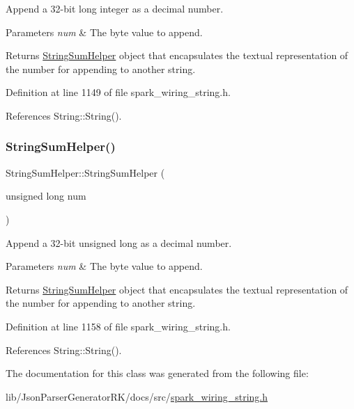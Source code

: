 Append a 32-\/bit long integer as a decimal number. 


\begin{DoxyParams}{Parameters}
{\em num} & The byte value to append.\\
\hline
\end{DoxyParams}
\begin{DoxyReturn}{Returns}
\hyperlink{class_string_sum_helper}{String\+Sum\+Helper} object that encapsulates the textual representation of the number for appending to another string. 
\end{DoxyReturn}


Definition at line 1149 of file spark\+\_\+wiring\+\_\+string.\+h.



References String\+::\+String().

\mbox{\label{class_string_sum_helper_ad05bd49f0b730d78d0a5dcf1b8c512eb}} 
\subsubsection{\texorpdfstring{String\+Sum\+Helper()}{StringSumHelper()}\hspace{0.1cm}{\footnotesize\ttfamily [8/8]}}
{\footnotesize\ttfamily String\+Sum\+Helper\+::\+String\+Sum\+Helper (\begin{DoxyParamCaption}\item[{unsigned long}]{num }\end{DoxyParamCaption})\hspace{0.3cm}{\ttfamily [inline]}}



Append a 32-\/bit unsigned long as a decimal number. 


\begin{DoxyParams}{Parameters}
{\em num} & The byte value to append.\\
\hline
\end{DoxyParams}
\begin{DoxyReturn}{Returns}
\hyperlink{class_string_sum_helper}{String\+Sum\+Helper} object that encapsulates the textual representation of the number for appending to another string. 
\end{DoxyReturn}


Definition at line 1158 of file spark\+\_\+wiring\+\_\+string.\+h.



References String\+::\+String().



The documentation for this class was generated from the following file\+:\begin{DoxyCompactItemize}
\item 
lib/\+Json\+Parser\+Generator\+R\+K/docs/src/\hyperlink{docs_2src_2spark__wiring__string_8h}{spark\+\_\+wiring\+\_\+string.\+h}\end{DoxyCompactItemize}
